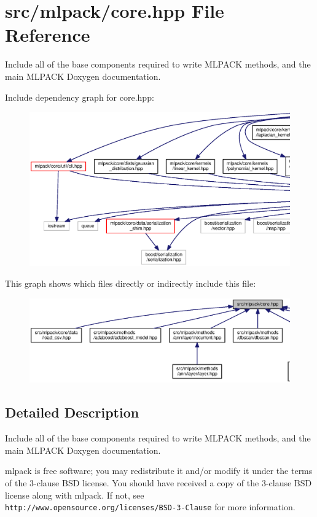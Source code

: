 \section{src/mlpack/core.hpp File Reference}
\label{core_8hpp}


Include all of the base components required to write M\+L\+P\+A\+CK methods, and the main M\+L\+P\+A\+CK Doxygen documentation.  


Include dependency graph for core.\+hpp\+:
\nopagebreak
\begin{figure}[H]
\begin{center}
\leavevmode
\includegraphics[width=350pt]{core_8hpp__incl}
\end{center}
\end{figure}
This graph shows which files directly or indirectly include this file\+:
\nopagebreak
\begin{figure}[H]
\begin{center}
\leavevmode
\includegraphics[width=350pt]{core_8hpp__dep__incl}
\end{center}
\end{figure}


\subsection{Detailed Description}
Include all of the base components required to write M\+L\+P\+A\+CK methods, and the main M\+L\+P\+A\+CK Doxygen documentation. 

mlpack is free software; you may redistribute it and/or modify it under the terms of the 3-\/clause B\+SD license. You should have received a copy of the 3-\/clause B\+SD license along with mlpack. If not, see {\tt http\+://www.\+opensource.\+org/licenses/\+B\+S\+D-\/3-\/\+Clause} for more information. 